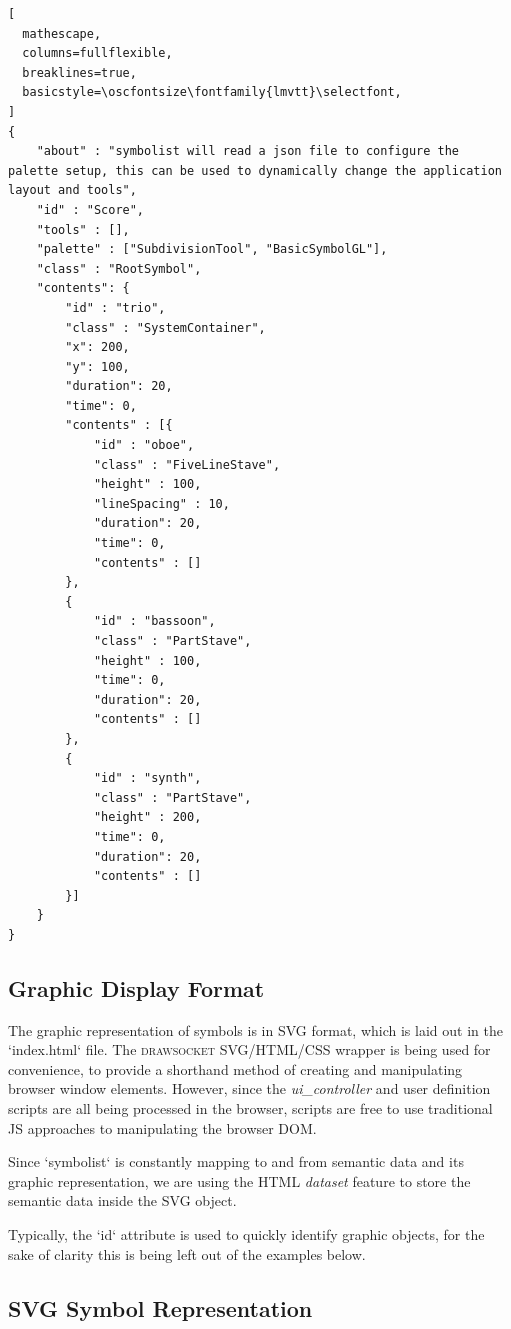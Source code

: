 \documentclass{article}
\def\drawsocket{\textsc{drawsocket}\xspace}
\def\oscfontsize{\footnotesize}
\begin{document}
\begin{lstlisting}[
  mathescape,
  columns=fullflexible,
  breaklines=true,
  basicstyle=\oscfontsize\fontfamily{lmvtt}\selectfont,
]
{
    "about" : "symbolist will read a json file to configure the palette setup, this can be used to dynamically change the application layout and tools",
    "id" : "Score",
    "tools" : [],
    "palette" : ["SubdivisionTool", "BasicSymbolGL"],
    "class" : "RootSymbol",
    "contents": { 
        "id" : "trio",
        "class" : "SystemContainer",
        "x": 200,
        "y": 100,
        "duration": 20,
        "time": 0,
        "contents" : [{
            "id" : "oboe",
            "class" : "FiveLineStave",
            "height" : 100,
            "lineSpacing" : 10,
            "duration": 20,
            "time": 0,
            "contents" : []
        },
        {
            "id" : "bassoon",
            "class" : "PartStave",
            "height" : 100,
            "time": 0,
            "duration": 20,
            "contents" : []
        },
        {
            "id" : "synth",
            "class" : "PartStave",
            "height" : 200,
            "time": 0,
            "duration": 20,
            "contents" : []
        }]
    }
}
\end{lstlisting}


\subsection{Graphic Display Format}\label{subsec:file_format}

The graphic representation of symbols is in SVG format, which is laid out in the `index.html` file. The \drawsocket SVG/HTML/CSS wrapper is being used for convenience, to provide a shorthand method of creating and manipulating browser window elements. However, since the \textit{ui\_controller} and user definition scripts are all being processed in the browser, scripts are free to use traditional JS approaches to manipulating the browser DOM.

Since `symbolist` is constantly mapping to and from semantic data and its graphic representation, we are using the HTML \textit{dataset} feature to store the semantic data inside the SVG object.

Typically, the `id` attribute is used to quickly identify graphic objects, for the sake of clarity this is being left out of the examples below.

\subsection{SVG Symbol Representation}\label{subsec:ui_symbol}
\end{document}
